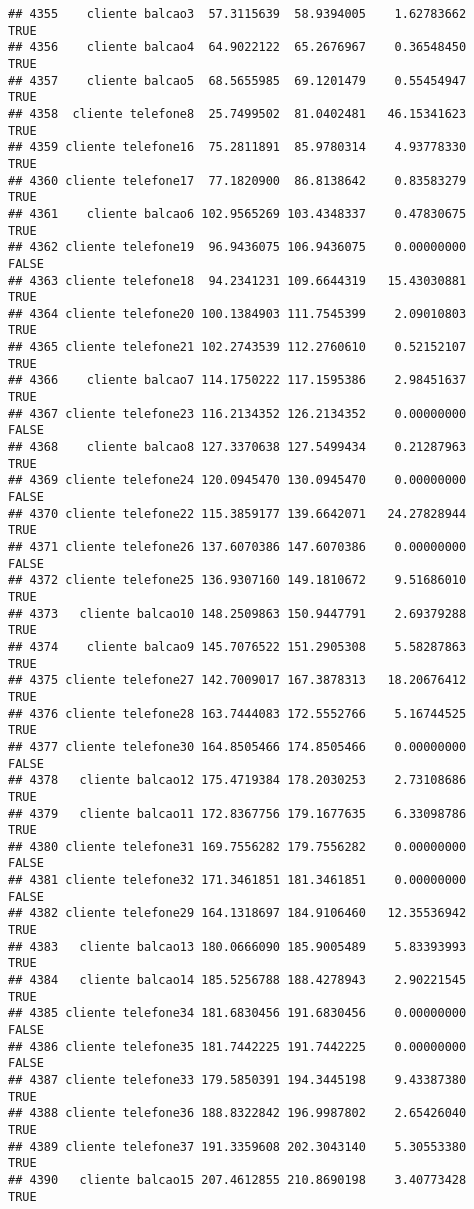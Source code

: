 \documentclass[
]{article}
\begin{document}
\begin{verbatim}
## 4355    cliente balcao3  57.3115639  58.9394005    1.62783662     TRUE
## 4356    cliente balcao4  64.9022122  65.2676967    0.36548450     TRUE
## 4357    cliente balcao5  68.5655985  69.1201479    0.55454947     TRUE
## 4358  cliente telefone8  25.7499502  81.0402481   46.15341623     TRUE
## 4359 cliente telefone16  75.2811891  85.9780314    4.93778330     TRUE
## 4360 cliente telefone17  77.1820900  86.8138642    0.83583279     TRUE
## 4361    cliente balcao6 102.9565269 103.4348337    0.47830675     TRUE
## 4362 cliente telefone19  96.9436075 106.9436075    0.00000000    FALSE
## 4363 cliente telefone18  94.2341231 109.6644319   15.43030881     TRUE
## 4364 cliente telefone20 100.1384903 111.7545399    2.09010803     TRUE
## 4365 cliente telefone21 102.2743539 112.2760610    0.52152107     TRUE
## 4366    cliente balcao7 114.1750222 117.1595386    2.98451637     TRUE
## 4367 cliente telefone23 116.2134352 126.2134352    0.00000000    FALSE
## 4368    cliente balcao8 127.3370638 127.5499434    0.21287963     TRUE
## 4369 cliente telefone24 120.0945470 130.0945470    0.00000000    FALSE
## 4370 cliente telefone22 115.3859177 139.6642071   24.27828944     TRUE
## 4371 cliente telefone26 137.6070386 147.6070386    0.00000000    FALSE
## 4372 cliente telefone25 136.9307160 149.1810672    9.51686010     TRUE
## 4373   cliente balcao10 148.2509863 150.9447791    2.69379288     TRUE
## 4374    cliente balcao9 145.7076522 151.2905308    5.58287863     TRUE
## 4375 cliente telefone27 142.7009017 167.3878313   18.20676412     TRUE
## 4376 cliente telefone28 163.7444083 172.5552766    5.16744525     TRUE
## 4377 cliente telefone30 164.8505466 174.8505466    0.00000000    FALSE
## 4378   cliente balcao12 175.4719384 178.2030253    2.73108686     TRUE
## 4379   cliente balcao11 172.8367756 179.1677635    6.33098786     TRUE
## 4380 cliente telefone31 169.7556282 179.7556282    0.00000000    FALSE
## 4381 cliente telefone32 171.3461851 181.3461851    0.00000000    FALSE
## 4382 cliente telefone29 164.1318697 184.9106460   12.35536942     TRUE
## 4383   cliente balcao13 180.0666090 185.9005489    5.83393993     TRUE
## 4384   cliente balcao14 185.5256788 188.4278943    2.90221545     TRUE
## 4385 cliente telefone34 181.6830456 191.6830456    0.00000000    FALSE
## 4386 cliente telefone35 181.7442225 191.7442225    0.00000000    FALSE
## 4387 cliente telefone33 179.5850391 194.3445198    9.43387380     TRUE
## 4388 cliente telefone36 188.8322842 196.9987802    2.65426040     TRUE
## 4389 cliente telefone37 191.3359608 202.3043140    5.30553380     TRUE
## 4390   cliente balcao15 207.4612855 210.8690198    3.40773428     TRUE

\end{verbatim}
\end{document}
